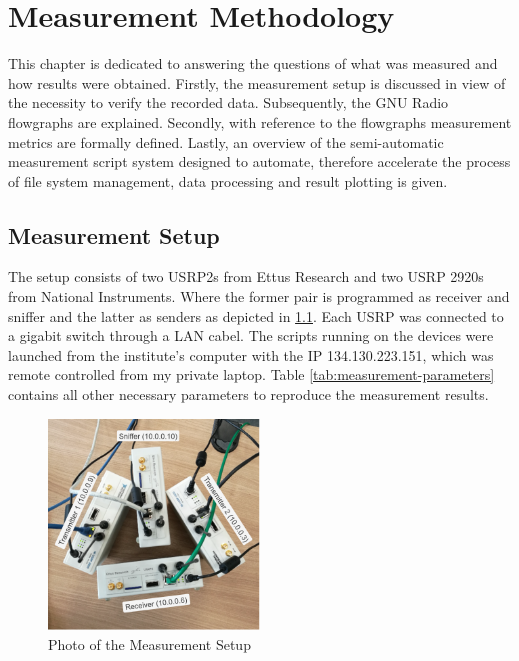 \chapter{Measurement Methodology}

This chapter is dedicated to answering the questions of what was measured and how results were obtained. Firstly, the measurement setup is discussed in view of the necessity to verify the recorded data. Subsequently,  the GNU Radio flowgraphs are explained. Secondly, with reference to the flowgraphs measurement metrics are formally defined.  Lastly, an overview of the semi-automatic measurement script system designed to automate, therefore accelerate the process of file system management, data processing and result plotting is given.

\section{Measurement Setup}

The setup consists of two USRP2s from Ettus Research and two USRP 2920s from National Instruments. Where the former pair is programmed as receiver and sniffer and the latter  as senders as depicted in \ref{fig:measurement-setup}. Each USRP was connected to a gigabit switch through a LAN cabel. The scripts running on the devices were launched from the institute's computer with the IP 134.130.223.151, which was remote controlled from my private laptop. Table \ref{tab:measurement-parameters} contains all other necessary parameters to reproduce the measurement results.

\begin{figure}[tb]
	\label{fig:measurement-setup}
	\begin{center}
		\includegraphics[width=0.5\textwidth]{pictures/measurement_setup}
	\end{center}
	\caption{Photo of the Measurement Setup}
\end{figure}

